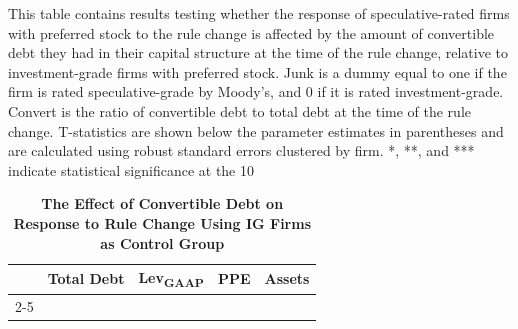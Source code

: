\documentclass[a4paper, 12pt]{article}
\begin{document}
\newpage


\begin{table}[htbp]
\caption{\textbf{The Effect of Convertible Debt on Response to Rule Change Using IG Firms as Control Group }} \label{table_convertIG}
\begin{singlespace}
\begin{small}

\noindent This table contains results testing whether the response of speculative-rated firms with preferred stock to the rule change is affected by the amount of convertible debt they had in their capital structure at the time of the rule change, relative to investment-grade firms with preferred stock. Junk is a dummy equal to one if the firm is rated speculative-grade by Moody's, and 0 if it is rated investment-grade. Convert is the ratio of convertible debt to total debt at the time of the rule change. T-statistics are shown below the parameter estimates in parentheses and are calculated using robust standard errors clustered by firm. *, **, and *** indicate statistical significance at the 10


\end{small}
\end{singlespace}
\vspace{3mm}
\small
  \centering
    \begin{tabular}{lcccc}
    \toprule
    \textbf{ } &
      \multicolumn{1}{c}{\textbf{Total Debt}} &  \multicolumn{1}{c}{\textbf{Lev\textsubscript{GAAP}}} &
         \multicolumn{1}{c}{\textbf{PPE}} &  \multicolumn{1}{c}{\textbf{Assets}}
      \\
      \cline{2-5}

  

    \bottomrule
    \end{tabular}
\end{table}
\clearpage
\end{document}
